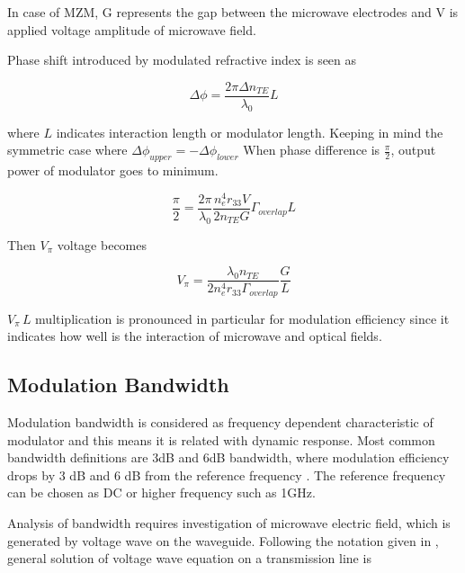 \documentclass[thesis]{deutez}
\begin{document}
    In case of MZM, G represents the gap between the microwave electrodes and V is applied voltage amplitude of  microwave field. 

    Phase shift introduced by modulated refractive index is seen as 

    \begin{equation}
        \Delta \phi = \frac{2\pi\Delta n_{TE}}{\lambda_0} L
       \label{eq:phase-change} 
    \end{equation}

    where $L$ indicates interaction length or modulator length. Keeping in mind the symmetric case where $\Delta\phi_{upper}=-\Delta\phi_{lower}$ When phase difference is $\frac{\pi}{2}$, output power of modulator goes to minimum. 
    
    \begin{equation}
        \frac{\pi}{2} = \frac{2\pi}{\lambda_0} \frac{n_e^4r_{33}V}{2n_{TE}G} \Gamma_{overlap} L
       \label{eq:phase-change-2} 
    \end{equation}

    Then $V_\pi$ voltage becomes

    \begin{equation}
        V_\pi = \frac{\lambda_0 n_{TE}}{2n_e^4r_{33}\Gamma_{overlap}}\frac{G}{L}
        \label{eq:vpiL-calculation_on_matlab}
    \end{equation}

    $V_\pi\,L$ multiplication is pronounced in particular for modulation efficiency since it indicates how well is the interaction of microwave and optical fields.
    

    \subsection{Modulation Bandwidth}
    \label{sec:modulation_bandwidth}
    Modulation bandwidth is considered as frequency dependent characteristic of modulator and this means it is related with dynamic response. Most common bandwidth definitions are 3dB and 6dB bandwidth, where modulation efficiency drops by 3 dB and 6 dB from the reference frequency \cite{1}. The reference frequency can be chosen as DC or higher frequency such as 1GHz. 
    
	Analysis of bandwidth requires investigation of microwave electric field, which is generated by voltage wave on the waveguide. Following the notation given in \cite{16}, general solution of voltage wave equation on a transmission line is  
	
\end{document}
